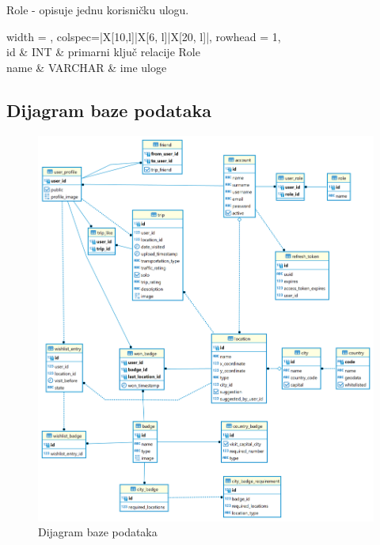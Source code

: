 				Role - opisuje jednu korisničku ulogu.
				\begin{longtblr}[
					label=none,
					entry=none
					]{
						width = \textwidth,
						colspec={|X[10,l]|X[6, l]|X[20, l]|},
						rowhead = 1,
					}
					\hline {}	 \\ \hline[3pt]
					id & INT	&  primarni	ključ relacije Role \\ \hline
					name & VARCHAR & ime uloge\\ \hline
				\end{longtblr}







			\subsection{Dijagram baze podataka}
				\begin{figure}[H]
        			\includegraphics[scale=0.2]{slike/dijagram_baze.png} %
        			\centering
        			\caption{Dijagram baze podataka}

        		\end{figure}


